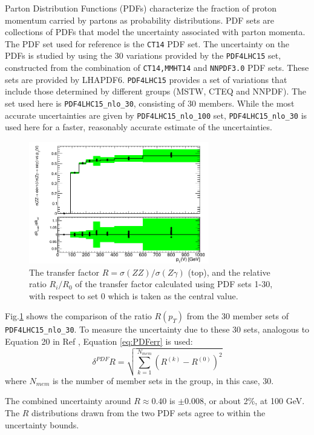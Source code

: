 \documentclass[11pt,a4paper]{report}
\begin{document}
Parton Distribution Functions (PDFs) characterize the fraction of proton momentum carried by partons as probability distributions. PDF sets are collections of PDFs that model the uncertainty associated with parton momenta. The PDF set used for reference is the \texttt{CT14}\cite{CT14} PDF set. The uncertainty on the PDFs is studied by using the 30 variations provided by the \texttt{PDF4LHC15} set\cite{PDF4}, constructed from the combination of \texttt{CT14,MMHT14}\cite{MMHT14} and \texttt{NNPDF3.0}\cite{NNPDF3} PDF sets. These sets are provided by LHAPDF6\cite{LHAPDF}. \texttt{PDF4LHC15} provides a set of variations that include those determined by different groups (MSTW, CTEQ and NNPDF). The set used here is \texttt{PDF4LHC15\_nlo\_30}, consisting of 30 members. While the most accurate uncertainties are given by \texttt{PDF4LHC15\_nlo\_100} set, \texttt{PDF4LHC15\_nlo\_30} is used here for a faster, reasonably accurate estimate of the uncertainties.
\begin{figure}[H]
\centering
	\includegraphics[width = 0.7\textwidth]{R_pdf.png}
	\caption{The transfer factor $R = \sigma(ZZ)/\sigma(Z\gamma)$ (top), and the relative ratio $R_i/R_0$ of the transfer factor  calculated using PDF sets 1-30, with respect to set 0 which is taken as the central value. }
	\label{fig:PDF30var}
\end{figure}
\noindent Fig.\ref{fig:PDF30var} shows the comparison of the ratio $R(p_T)$ from the 30 member sets of \texttt{PDF4LHC15\_nlo\_30}. To measure the uncertainty due to these 30 sets, analogous to Equation 20 in Ref \cite{PDF4}, Equation \ref{eq:PDFerr} is used:
\begin{equation}\label{eq:PDFerr}
	\delta^{PDF}R = \sqrt{\sum^{N_{mem}}_{k=1} (R^{(k)} - R^{(0)})^2}
\end{equation}
where $N_{mem}$ is the number of member sets in the group, in this case, 30.

\noindent The combined uncertainty around $R \approx 0.40$ is $\pm 0.008$, or about 2\%, at 100 GeV. The $R$ distributions drawn from the two PDF sets agree to within the uncertainty bounds.
\end{document}
